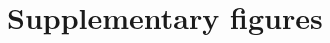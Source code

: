 \section{Supplementary figures}

\setcounter{figure}{0}

\renewcommand{\thefigure}{S\arabic{figure}}

















